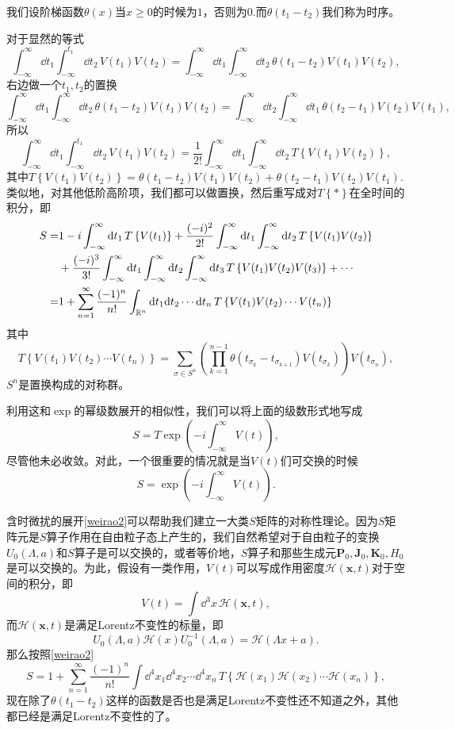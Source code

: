 我们设阶梯函数$\theta(x)$当$x\geq 0$的时候为$1$，否则为$0$.而$\theta(t_1-t_2)$我们称为时序。

对于显然的等式
\[
	\int_{-\infty}^{\infty}\dd t_1\int_{-\infty}^{t_1}\dd t_2\, V(t_1)V(t_2)=\int_{-\infty}^{\infty}\dd t_1\int_{-\infty}^{\infty}\dd t_2\, \theta(t_1-t_2)V(t_1)V(t_2),
\]
右边做一个$t_1,t_2$的置换
\[
	\int_{-\infty}^{\infty}\dd t_1\int_{-\infty}^{\infty}\dd t_2\, \theta(t_1-t_2)V(t_1)V(t_2)=\int_{-\infty}^{\infty}\dd t_2\int_{-\infty}^{\infty}\dd t_1\, \theta(t_2-t_1)V(t_2)V(t_1),
\]
所以
\[
	\int_{-\infty}^{\infty}\dd t_1\int_{-\infty}^{t_1}\dd t_2\, V(t_1)V(t_2)=\frac{1}{2!}\int_{-\infty}^{\infty}\dd t_1\int_{-\infty}^{\infty}\dd t_2\, T\left\{V(t_1)V(t_2)\right\},
\]
其中$T\left\{V(t_1)V(t_2)\right\}=\theta(t_1-t_2)V(t_1)V(t_2)+\theta(t_2-t_1)V(t_2)V(t_1)$.类似地，对其他低阶高阶项，我们都可以做置换，然后重写成对$T\left\{*\right\}$在全时间的积分，即
\begin{equation}
\label{weirao2}
\begin{split}
	S=&1-i\int_{-\infty}^{\infty}\mathrm{d} t_1 \, T\left\{V(t_1)\right\}+\frac{(-i)^2}{2!}\int_{-\infty}^{\infty}\mathrm{d} t_1\int_{-\infty}^{\infty}\mathrm{d} t_2\, T\left\{V(t_1)V(t_2)\right\}\\
	&+\frac{(-i)^3}{3!}\int_{-\infty}^{\infty}\mathrm{d} t_1\int_{-\infty}^{\infty}\mathrm{d} t_2\int_{-\infty}^{\infty}\mathrm{d} t_3\, T\left\{V(t_1)V(t_2)V(t_3)\right\}+\cdots\\
	=&1+\sum_{n=1}^{\infty}\frac{(-1)^n}{n!}\int_{\mathbb{R}^n}\mathrm{d} t_1\mathrm{d} t_2\cdots\mathrm{d} t_n\, T\left\{V(t_1)V(t_2)\cdots V(t_n)\right\}
\end{split}
\end{equation}
其中
\[
	T\left\{V(t_1)V(t_2)\cdots V(t_n)\right\}=\sum_{\sigma\in S^n}\left(\prod_{k=1}^{n-1}\theta(t_{\sigma_k}-t_{\sigma_{k+1}})V(t_{\sigma_k})
	\right)V(t_{\sigma_n}),
\]
$S^n$是置换构成的对称群。

利用这和$\exp$的幂级数展开的相似性，我们可以将上面的级数形式地写成
\[
	S=T\exp\left(-i\int_{-\infty}^{\infty}V(t)\right),
\]
尽管他未必收敛。对此，一个很重要的情况就是当$V(t)$们可交换的时候
\[
	S=\exp\left(-i\int_{-\infty}^{\infty}V(t)\right).
\]

含时微扰的展开\eqref{weirao2}可以帮助我们建立一大类$S$矩阵的对称性理论。因为$S$矩阵元是$S$算子作用在自由粒子态上产生的，我们自然希望对于自由粒子的变换$U_0(\Lambda,a)$和$S$算子是可以交换的，或者等价地，$S$算子和那些生成元$\bm{P}_0,\bm{J}_0,\bm{K}_0,H_0$是可以交换的。为此，假设有一类作用，$V(t)$可以写成作用密度$\mathscr{H}(\bm{x},t)$对于空间的积分，即
\[
	V(t)=\int \dd^3 x\,\mathscr{H}(\bm{x},t),
\]
而$\mathscr{H}(\bm{x},t)$是满足Lorentz不变性的标量，即
\[
	U_0(\Lambda,a)\mathscr{H}(x)U_0^{-1}(\Lambda,a)=\mathscr{H}(\Lambda x+a).
\]
那么按照\eqref{weirao2}
\[
S=1+\sum_{n=1}^{\infty}\frac{(-1)^n}{n!}\int\dd^4 x_1\dd^4 x_2\cdots\dd
^4 x_n\, T\left\{\mathscr{H}(x_1)\mathscr{H}(x_2)\cdots \mathscr{H}(x_n)\right\},
\]
现在除了$\theta(t_1-t_2)$这样的函数是否也是满足Lorentz不变性还不知道之外，其他都已经是满足Lorentz不变性的了。

